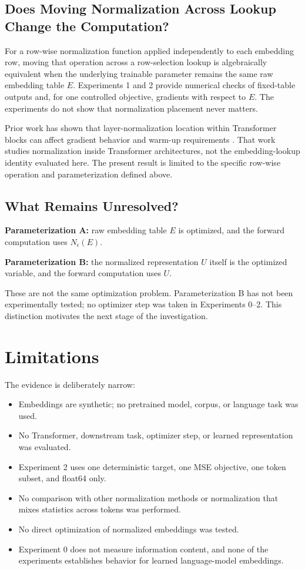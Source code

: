 \documentclass[conference]{IEEEtran}
\begin{document}
\subsection{Does Moving Normalization Across Lookup Change the Computation?}
For a row-wise normalization function applied independently to each embedding row, moving that operation across a row-selection lookup is algebraically equivalent when the underlying trainable parameter remains the same raw embedding table \(E\). Experiments 1 and 2 provide numerical checks of fixed-table outputs and, for one controlled objective, gradients with respect to \(E\). The experiments do not show that normalization placement never matters.

Prior work has shown that layer-normalization location within Transformer blocks can affect gradient behavior and warm-up requirements \cite{xiong2020layernorm}. That work studies normalization inside Transformer architectures, not the embedding-lookup identity evaluated here. The present result is limited to the specific row-wise operation and parameterization defined above.

\subsection{What Remains Unresolved?}
\textbf{Parameterization A:} raw embedding table \(E\) is optimized, and the forward computation uses \(N_{\epsilon}(E)\).

\textbf{Parameterization B:} the normalized representation \(U\) itself is the optimized variable, and the forward computation uses \(U\).

These are not the same optimization problem. Parameterization B has not been experimentally tested; no optimizer step was taken in Experiments 0--2. This distinction motivates the next stage of the investigation.

\section{Limitations}
The evidence is deliberately narrow:
\begin{itemize}
\item Embeddings are synthetic; no pretrained model, corpus, or language task was used.
\item No Transformer, downstream task, optimizer step, or learned representation was evaluated.
\item Experiment 2 uses one deterministic target, one MSE objective, one token subset, and float64 only.
\item No comparison with other normalization methods or normalization that mixes statistics across tokens was performed.
\item No direct optimization of normalized embeddings was tested.
\item Experiment 0 does not measure information content, and none of the experiments establishes behavior for learned language-model embeddings.
\end{itemize}
\end{document}
